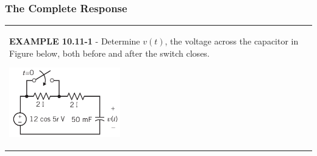 \documentclass[aspectratio=169]{beamer}
\begin{document}
\begin{frame}[fragile]
	\frametitle{The Complete Response}
\begin{tabular}{ll}
	\begin{columns}
		\begin{column}{1\textwidth}  %
		\textbf{EXAMPLE 10.11-1} - Determine $v(t)$, the voltage across the capacitor in Figure below, both before and after the switch closes.

		\begin{center}
    			\includegraphics[height=3cm]{figure43.png}	
		\end{center}	
		\scalebox{0.6}{Answer: $
	    v(t)=
	    \begin{cases}
	    8.49 \cos(5t-45^o), \ when \ t < 0 \\
	     -3.6e^{-10t}+10.74 \cos(5t-26.6^o), \ when \ t > 0 \\
	    
	    \end{cases}
	    $ }
		\end{column}
	\end{columns}
\end{tabular}	
\end{frame}
\end{document}
